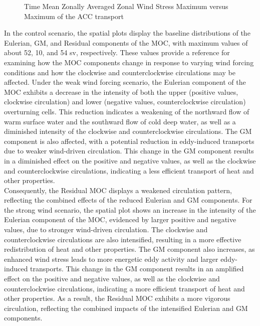 \documentclass[12pt]{article}
\begin{document}
\begin{figure}
    \begin{center}
    \caption{Time Mean Zonally Averaged Zonal Wind Stress Maximum versus Maximum of the ACC transport}
    \label{fig:R2a}
    \end{center}
\end{figure}


\noindent In the control scenario, the spatial plots display the baseline distributions of the Eulerian, GM, and Residual components of the MOC, with maximum values of about 52, 10, and 54 sv, respectively. These values provide a reference for examining how the MOC components change in response to varying wind forcing conditions and how the clockwise and counterclockwise circulations may be affected. Under the weak wind forcing scenario, the Eulerian component of the MOC exhibits a decrease in the intensity of both the upper (positive values, clockwise circulation) and lower (negative values, counterclockwise circulation) overturning cells. This reduction indicates a weakening of the northward flow of warm surface water and the southward flow of cold deep water, as well as a diminished intensity of the clockwise and counterclockwise circulations. The GM component is also affected, with a potential reduction in eddy-induced transports due to weaker wind-driven circulation. This change in the GM component results in a diminished effect on the positive and negative values, as well as the clockwise and counterclockwise circulations, indicating a less efficient transport of heat and other properties.\\

\noindent Consequently, the Residual MOC displays a weakened circulation pattern, reflecting the combined effects of the reduced Eulerian and GM components. For the strong wind scenario, the spatial plot shows an increase in the intensity of the Eulerian component of the MOC, evidenced by larger positive and negative values, due to stronger wind-driven circulation. The clockwise and counterclockwise circulations are also intensified, resulting in a more effective redistribution of heat and other properties. The GM component also increases, as enhanced wind stress leads to more energetic eddy activity and larger eddy-induced transports. This change in the GM component results in an amplified effect on the positive and negative values, as well as the clockwise and counterclockwise circulations, indicating a more efficient transport of heat and other properties. As a result, the Residual MOC exhibits a more vigorous circulation, reflecting the combined impacts of the intensified Eulerian and GM components.\\
\end{document}
